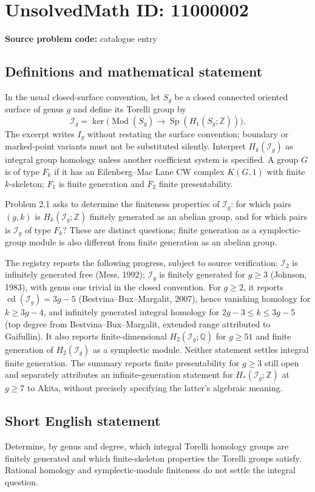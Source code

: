 \documentclass[11pt]{article}
\newcommand{\Z}{\mathbb{Z}}
\newcommand{\Q}{\mathbb{Q}}
\begin{document}
\section*{UnsolvedMath ID: 11000002}
\textbf{Source problem code:} catalogue entry
\subsection{Definitions and mathematical statement}
In the usual closed-surface convention, let $S_g$ be a closed connected oriented surface of genus $g$ and define its Torelli group by
\[
 \mathcal I_g=\ker\bigl(\operatorname{Mod}(S_g)
 \longrightarrow\operatorname{Sp}(H_1(S_g;\Z))\bigr).
\]
The excerpt writes $I_g$ without restating the surface convention; boundary or marked-point variants must not be substituted silently. Interpret $H_k(\mathcal I_g)$ as integral group homology unless another coefficient system is specified. A group $G$ is of type $F_k$ if it has an Eilenberg--Mac Lane CW complex $K(G,1)$ with finite $k$-skeleton; $F_1$ is finite generation and $F_2$ finite presentability.

Problem 2.1 asks to determine the finiteness properties of $\mathcal I_g$: for which pairs $(g,k)$ is $H_k(\mathcal I_g;\Z)$ finitely generated as an abelian group, and for which pairs is $\mathcal I_g$ of type $F_k$? These are distinct questions; finite generation as a symplectic-group module is also different from finite generation as an abelian group.

The registry reports the following progress, subject to source verification: $\mathcal I_2$ is infinitely generated free (Mess, 1992); $\mathcal I_g$ is finitely generated for $g\geq3$ (Johnson, 1983), with genus one trivial in the closed convention. For $g\geq2$, it reports $\operatorname{cd}(\mathcal I_g)=3g-5$ (Bestvina--Bux--Margalit, 2007), hence vanishing homology for $k\geq3g-4$, and infinitely generated integral homology for $2g-3\leq k\leq3g-5$ (top degree from Bestvina--Bux--Margalit, extended range attributed to Gaifullin). It also reports finite-dimensional $H_2(\mathcal I_g;\Q)$ for $g\geq51$ and finite generation of $H_2(\mathcal I_g)$ as a symplectic module. Neither statement settles integral finite generation. The summary reports finite presentability for $g\geq3$ still open and separately attributes an infinite-generation statement for $H_*(\mathcal I_g;\Z)$ at $g\geq7$ to Akita, without precisely specifying the latter's algebraic meaning.
\subsection{Short English statement}
Determine, by genus and degree, which integral Torelli homology groups are finitely generated and which finite-skeleton properties the Torelli groups satisfy. Rational homology and symplectic-module finiteness do not settle the integral question.
\end{document}
